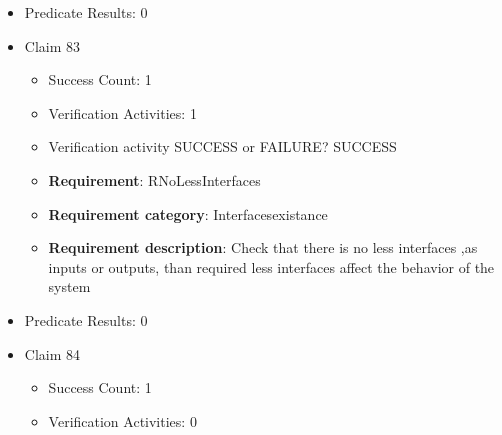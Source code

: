 \documentclass{article}
\begin{document}
\begin{itemize}
\begin{itemize}
						\item \textbf{Requirement}: Out052 
						\item \textbf{Requirement category}: Interfacesexistance 
						\item \textbf{Requirement description}: Its unit shall be m/s^2 Defining the output interface ensures correct integration and consistent communication with the simulation platform.
					
					\item Verification activity SUCCESS or FAILURE? SUCCESS
		
						\item \textbf{Requirement}: Out052 
						\item \textbf{Requirement category}: Interfacesexistance 
						\item \textbf{Requirement description}: Its unit shall be m/s^2 Defining the output interface ensures correct integration and consistent communication with the simulation platform.
					
				\end{itemize}
				
									    
				\item Predicate Results: 0

  				  \item Claim 83
				\begin{itemize}
			    	\item Success Count: 1 
			    	\item Verification Activities: 1
					\item Verification activity SUCCESS or FAILURE? SUCCESS
		
						\item \textbf{Requirement}: RNoLessInterfaces 
						\item \textbf{Requirement category}: Interfacesexistance 
						\item \textbf{Requirement description}: Check that there is no less interfaces ,as inputs or outputs, than required  less interfaces affect the behavior of the system
					
				\end{itemize}
				
									    
				\item Predicate Results: 0

  				  \item Claim 84
				\begin{itemize}
			    	\item Success Count: 1 
			    	\item Verification Activities: 0
				\end{itemize}
				

\end{itemize}
\end{document}
